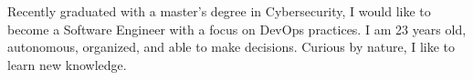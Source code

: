 
\begin{cvparagraph}
    Recently graduated with a master's degree in Cybersecurity, I would like to become a Software Engineer with a focus on DevOps practices. 
    I am 23 years old, autonomous, organized, and able to make decisions. Curious by nature, I like to learn new knowledge.
\end{cvparagraph}
